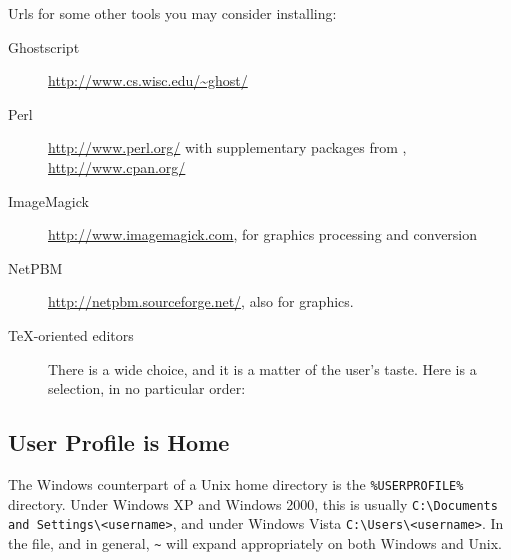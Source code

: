 \documentclass{article}
\begin{document}
Urls for some other tools you may consider installing:
\begin{description}
\item[Ghostscript] \url{http://www.cs.wisc.edu/~ghost/}
\item[Perl] \url{http://www.perl.org/} with
      supplementary packages from , \url{http://www.cpan.org/}
\item[ImageMagick] \url{http://www.imagemagick.com}, for graphics
      processing and conversion
\item[NetPBM] \url{http://netpbm.sourceforge.net/}, also for graphics.
      
\item[\TeX-oriented editors] There is a wide choice, and it is a matter of the
      user's taste. Here is a selection, in no particular order:
\end{description}


\subsection{User Profile is Home}
\label{sec:winhome}

The Windows counterpart of a Unix home directory is the
\verb|%USERPROFILE%| directory.  Under Windows XP and Windows 2000, this
is usually \verb|C:\Documents and Settings\<username>|, and under
Windows Vista \verb|C:\Users\<username>|.  In the
 file, and \KPS{} in general, \verb|~| will expand
appropriately on both Windows and Unix.
\end{document}
